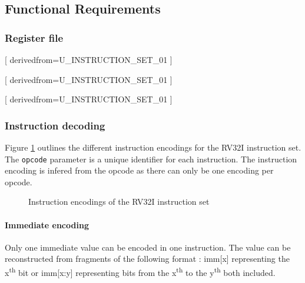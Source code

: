  \subsection{Functional Requirements}

    \subsubsection{Register file}

      [
          derivedfrom=U\_INSTRUCTION\_SET\_01
        ]

      [
          derivedfrom=U\_INSTRUCTION\_SET\_01
        ]

      [
          derivedfrom=U\_INSTRUCTION\_SET\_01
        ]

    \subsubsection{Instruction decoding}

      \begin{content}
          Figure \ref{fig:instructionencoding} outlines the different instruction encodings for the RV32I instruction set. The \texttt{opcode} parameter is a unique identifier for each instruction. The instruction encoding is infered from the opcode as there can only be one encoding per opcode.
        \end{content}

      \begin{figure}[h!]
          \centering
          
          \caption{Instruction encodings of the RV32I instruction set}
          \label{fig:instructionencoding}
        \end{figure}

      \paragraph{Immediate encoding}

      \begin{content}
          Only one immediate value can be encoded in one instruction. The value can be reconstructed from fragments of the following format : imm[x] representing the x\textsuperscript{th} bit or imm[x:y] representing bits from the x\textsuperscript{th} to the y\textsuperscript{th} both included.
        \end{content}

